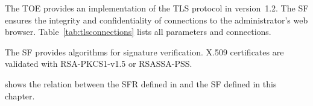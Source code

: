 

The TOE provides an implementation of the TLS protocol in version~1.2. The SF
ensures the integrity and confidentiality of connections to the administrator's
web browser. Table~\vref{tab:tlsconnections} lists all parameters and connections.


The SF  provides algorithms for signature
verification. X.509 certificates are validated with RSA-PKCS1-v1.5 or
RSASSA-PSS.



\pagebreak


 shows the relation between the SFR defined in
 and the SF defined in this chapter.




